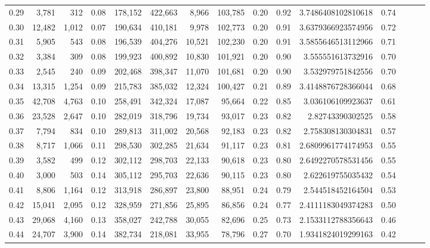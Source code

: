 \begin{tabular}{rrrrrrrrrrrrrrr}
0.29 &   3,781 &    312 &  0.08 &  178,152 &  422,663 &    8,966 &  103,785 &  0.20 &  0.92 &    3.7486408102810618 &      0.74 \\
0.30 &  12,482 &  1,012 &  0.07 &  190,634 &  410,181 &    9,978 &  102,773 &  0.20 &  0.91 &    3.6379366923574956 &      0.72 \\
0.31 &   5,905 &    543 &  0.08 &  196,539 &  404,276 &   10,521 &  102,230 &  0.20 &  0.91 &    3.5855646513112966 &      0.71 \\
0.32 &   3,384 &    309 &  0.08 &  199,923 &  400,892 &   10,830 &  101,921 &  0.20 &  0.90 &     3.555551613732916 &      0.70 \\
0.33 &   2,545 &    240 &  0.09 &  202,468 &  398,347 &   11,070 &  101,681 &  0.20 &  0.90 &     3.532979751842556 &      0.70 \\
0.34 &  13,315 &  1,254 &  0.09 &  215,783 &  385,032 &   12,324 &  100,427 &  0.21 &  0.89 &    3.4148876728366044 &      0.68 \\
0.35 &  42,708 &  4,763 &  0.10 &  258,491 &  342,324 &   17,087 &   95,664 &  0.22 &  0.85 &     3.036106109923637 &      0.61 \\
0.36 &  23,528 &  2,647 &  0.10 &  282,019 &  318,796 &   19,734 &   93,017 &  0.23 &  0.82 &      2.82743390302525 &      0.58 \\
0.37 &   7,794 &    834 &  0.10 &  289,813 &  311,002 &   20,568 &   92,183 &  0.23 &  0.82 &     2.758308130304831 &      0.57 \\
0.38 &   8,717 &  1,066 &  0.11 &  298,530 &  302,285 &   21,634 &   91,117 &  0.23 &  0.81 &    2.6809961774174953 &      0.55 \\
0.39 &   3,582 &    499 &  0.12 &  302,112 &  298,703 &   22,133 &   90,618 &  0.23 &  0.80 &    2.6492270578531456 &      0.55 \\
0.40 &   3,000 &    503 &  0.14 &  305,112 &  295,703 &   22,636 &   90,115 &  0.23 &  0.80 &     2.622619755035432 &      0.54 \\
0.41 &   8,806 &  1,164 &  0.12 &  313,918 &  286,897 &   23,800 &   88,951 &  0.24 &  0.79 &     2.544518452164504 &      0.53 \\
0.42 &  15,041 &  2,095 &  0.12 &  328,959 &  271,856 &   25,895 &   86,856 &  0.24 &  0.77 &    2.4111183049374283 &      0.50 \\
0.43 &  29,068 &  4,160 &  0.13 &  358,027 &  242,788 &   30,055 &   82,696 &  0.25 &  0.73 &    2.1533112788356643 &      0.46 \\
0.44 &  24,707 &  3,900 &  0.14 &  382,734 &  218,081 &   33,955 &   78,796 &  0.27 &  0.70 &    1.9341824019299163 &      0.42 \\

\end{tabular}
